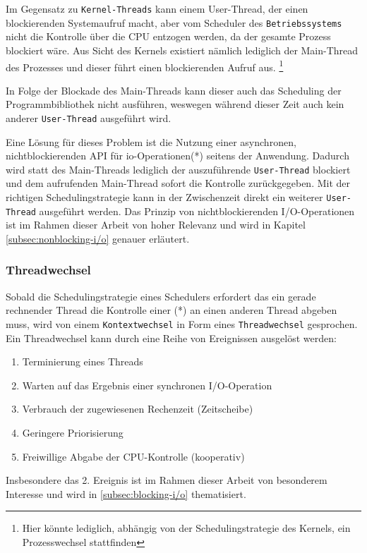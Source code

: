 Im Gegensatz zu \verb|Kernel-Threads| kann einem User-Thread, der einen blockierenden Systemaufruf macht,
aber vom Scheduler des \verb|Betriebssystems| nicht die Kontrolle über die CPU entzogen werden, da der gesamte Prozess blockiert wäre.
Aus Sicht des Kernels existiert nämlich lediglich der Main-Thread des Prozesses und dieser
führt einen blockierenden Aufruf aus. \footnote{Hier könnte lediglich, abhängig von der Schedulingstrategie des Kernels, ein Prozesswechsel stattfinden}

In Folge der Blockade des Main-Threads kann dieser auch das Scheduling der Programmbibliothek nicht ausführen, weswegen während dieser
Zeit auch kein anderer \verb|User-Thread| ausgeführt wird.

Eine Lösung für dieses Problem ist die Nutzung einer asynchronen, nichtblockierenden API für \gls{io}-Operationen(*)
seitens der Anwendung.
Dadurch wird statt des Main-Threads lediglich der auszuführende \verb|User-Thread| blockiert und dem aufrufenden Main-Thread
sofort die Kontrolle zurückgegeben. Mit der richtigen Schedulingstrategie kann in der Zwischenzeit direkt ein
weiterer \verb|User-Thread| ausgeführt werden. \parencite[Kapitel 2.2.4]{Tanenbaum2016}
Das Prinzip von nichtblockierenden I/O-Operationen ist im Rahmen dieser Arbeit von hoher Relevanz und wird in Kapitel \ref{subsec:nonblocking-i/o}
genauer erläutert.

\subsubsection{Threadwechsel}
\label{subsubsec:threadwechsel}
Sobald die Schedulingstrategie eines Schedulers erfordert das ein gerade rechnender Thread die Kontrolle einer (*) an
einen anderen Thread abgeben muss, wird von einem \verb|Kontextwechsel| in Form eines \verb|Threadwechsel| gesprochen.
Ein Threadwechsel kann durch eine Reihe von Ereignissen ausgelöst werden:
\begin{enumerate}
  \item Terminierung eines Threads
  \item Warten auf das Ergebnis einer synchronen I/O-Operation
  \item Verbrauch der zugewiesenen Rechenzeit (Zeitscheibe)
  \item Geringere Priorisierung
  \item Freiwillige Abgabe der CPU-Kontrolle (kooperativ)
\end{enumerate}

Insbesondere das 2. Ereignis ist im Rahmen dieser Arbeit von besonderem Interesse und wird in \ref{subsec:blocking-i/o} thematisiert.

